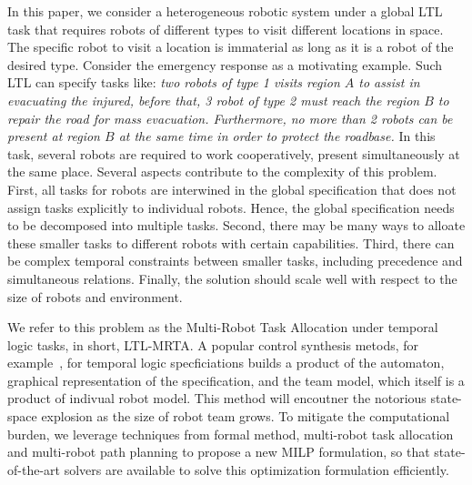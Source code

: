 \documentclass[Afour,sageh,times]{sagej}
\begin{document}
In this paper, we consider a heterogeneous robotic system under a global LTL task that requires robots of different types to visit different locations in space. The specific robot to visit a location is immaterial as long as it is a robot of the desired type. Consider the emergency response as a motivating example. Such LTL can specify tasks like: {\it two robots of type 1 visits region $A$ to assist in evacuating the injured, before that, 3 robot of type 2 must reach the region $B$ to repair the road for mass evacuation. Furthermore,  no more than 2 robots  can be present at region $B$ at the same time in order to protect the roadbase.} In this task, several robots are required to work cooperatively, present simultaneously at the same place. Several aspects contribute to the complexity of this problem. First, all tasks for robots are interwined in the global specification that does not assign tasks explicitly to individual robots. Hence, the global specification needs to be decomposed into multiple tasks. Second, there may be many ways to alloate these smaller tasks to different robots with certain capabilities. Third, there can be complex temporal constraints between smaller tasks, including precedence and simultaneous relations. Finally, the solution should scale well with respect to the size of robots and environment.

We refer to this problem as the Multi-Robot Task Allocation under temporal logic tasks, in short, LTL-MRTA. A popular  control synthesis metods, for example~\cite{guo2015multi}, for temporal logic specficiations builds a product of the automaton, graphical representation of the specification, and the team model, which itself is a product of indivual robot model. This method will encoutner the notorious state-space explosion as the size of robot team grows. To mitigate the computational burden, we leverage techniques from formal method, multi-robot task allocation and multi-robot path planning to propose a new MILP formulation, so that state-of-the-art solvers are available to solve this optimization formulation efficiently.
\end{document}
